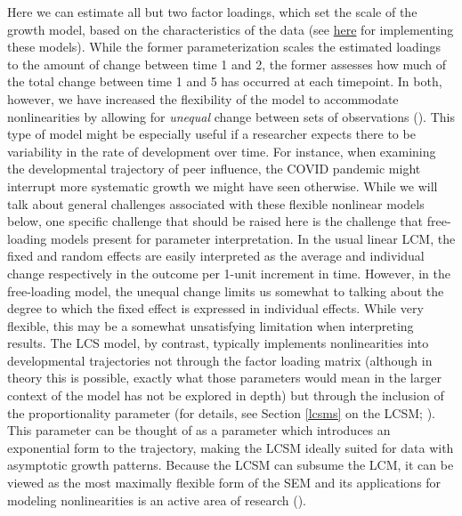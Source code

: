 \documentclass[11pt]{article}
\begin{document}
Here we can estimate all but two factor loadings, which set the scale of the growth model, based on the characteristics of the data (see \href{https://e-m-mccormick.github.io/static/longitudinal-primer/04-shape.html#nonlinear-trajectories}{here} for implementing these models). While the former parameterization scales the estimated loadings to the amount of change between time 1 and 2, the former assesses how much of the total change between time 1 and 5 has occurred at each timepoint. In both, however, we have increased the flexibility of the model to accommodate nonlinearities by allowing for \textit{unequal} change between sets of observations (\cite{debatin_does_2019,mcardle_latent_2009}). This type of model might be especially useful if a researcher expects there to be variability in the rate of development over time. For instance, when examining the developmental trajectory of peer influence, the COVID pandemic might interrupt more systematic growth we might have seen otherwise. While we will talk about general challenges associated with these flexible nonlinear models below, one specific challenge that should be raised here is the challenge that free-loading models present for parameter interpretation. In the usual linear LCM, the fixed and random effects are easily interpreted as the average and individual change respectively in the outcome per 1-unit increment in time. However, in the free-loading model, the unequal change limits us somewhat to talking about the degree to which the fixed effect is expressed in individual effects. While very flexible, this may be a somewhat unsatisfying limitation when interpreting results. The LCS model, by contrast, typically implements nonlinearities into developmental trajectories not through the factor loading matrix (although in theory this is possible, exactly what those parameters would mean in the larger context of the model has not be explored in depth) but through the inclusion of the proportionality parameter (for details, see Section \ref{lcsms} on the LCSM; \cite{grimm_recent_2012}). This parameter can be thought of as a  parameter which introduces an exponential form to the trajectory, making the LCSM ideally suited for data with asymptotic growth patterns. Because the LCSM can subsume the LCM, it can be viewed as the most maximally flexible form of the SEM and its applications for modeling nonlinearities is an active area of research (\cite{grimm_recent_2012,grimm_modeling_2013,grimm_nonlinear_2009,ram_using_2007}).
\end{document}
